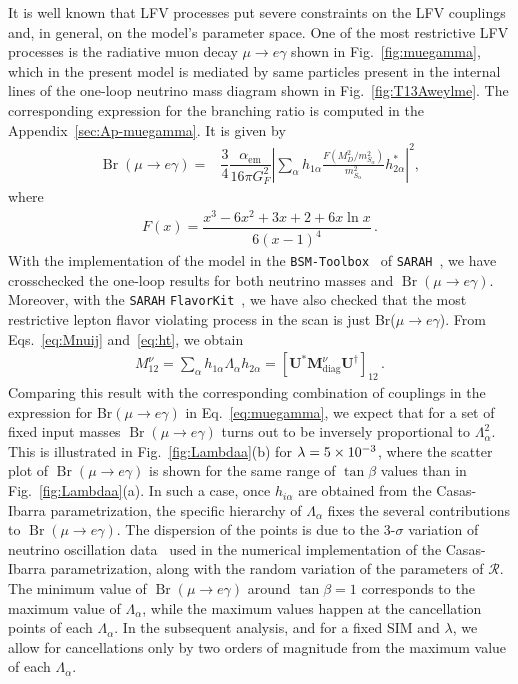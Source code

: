 It is well known that LFV processes put severe constraints on the LFV
couplings and, in general, on the model's parameter space. 
One of the most restrictive LFV processes is the radiative muon decay
$\mu\to e\gamma$ shown in Fig.~\ref{fig:muegamma}, which in the present model is mediated by same
particles present in the internal lines of the one-loop neutrino mass
diagram shown in Fig.~\ref{fig:T13Aweylme}. 
The corresponding expression for the branching ratio is computed in the Appendix~\ref{sec:Ap-muegamma}. It is given by
%
\begin{align}
\label{eq:muegamma}
\operatorname{Br}(\mu \rightarrow e \gamma)=&\dfrac{3}{4}\dfrac{\alpha_{\text{em}}}{16 \pi G_F^2}\left|\sum_{\alpha}
h_{1\alpha}\frac{F\left(M_D^2/m_{S_{\alpha}}^2  \right) }{m_{S_\alpha}^2}h_{2\alpha}^{*}  \right|^2 ,
\end{align}
where
\begin{align}
F(x)=\dfrac{x^3-6x^2+3x+2+6x\ln x}{6(x-1)^4}\,.
\end{align}
%
With the implementation of the model in the
\texttt{BSM-Toolbox}~\cite{Staub:2011dp} of
\texttt{SARAH}~\cite{Staub:2008uz,Staub:2013tta}, we have crosschecked
the one-loop results for both neutrino masses and $\operatorname{Br}(\mu
\rightarrow e \gamma)$.
Moreover, with the \texttt{SARAH}
\texttt{FlavorKit}~\cite{Porod:2014xia}, we have also checked that the
most restrictive lepton flavor violating process in the scan is just Br($\mu\to e\gamma$).
%
From Eqs.~\eqref{eq:Mnuij} and~\eqref{eq:ht}, we obtain
\begin{align}
  M^{\nu}_{12}=\sum_{\alpha} h_{1\alpha} \Lambda_{\alpha}
  h_{2\alpha}=\left[ \mathbf{U}^{*}\mathbf{M}^{\nu}_{\text{diag}}\mathbf{U}^{\dagger} \right]_{12}\,.%
\end{align}
Comparing this result with the corresponding combination of couplings
in the expression for Br$(\mu\to e\gamma)$ in Eq.~\eqref{eq:muegamma},
we expect that for a set of fixed input masses $\operatorname{Br}(\mu
\rightarrow e \gamma)$ turns out to be inversely proportional to
$\Lambda_\alpha^2$.
This is illustrated in Fig.~\ref{fig:Lambdaa}(b)
for $\lambda=\num{5E-3}$, where the scatter plot of
$\operatorname{Br}(\mu\to e \gamma)$ is shown for the same range of $\tan\beta$ values 
 than in Fig.~\ref{fig:Lambdaa}(a).  In such a case, once
$h_{i\alpha}$ are obtained from the Casas-Ibarra parametrization, the
specific hierarchy of $\Lambda_{\alpha}$ fixes the several contributions
to $\operatorname{Br}(\mu \rightarrow e \gamma)$.  The dispersion of
the points is due to the 3-$\sigma$ variation of neutrino oscillation
data~\cite{Forero:2014bxa} used in the numerical implementation of the Casas-Ibarra
 parametrization, along with the random variation of the parameters of
$\boldsymbol{\mathcal{R}}$. The minimum value of
$\operatorname{Br}(\mu \rightarrow e \gamma)$ around $\tan\beta=1$
corresponds to the maximum value of $\Lambda_{\alpha}$, while the
maximum values happen at the cancellation points of each
$\Lambda_{\alpha}$. In the subsequent analysis, and for a fixed SIM and $\lambda$, we allow 
for cancellations only by two orders of magnitude from the maximum
value of each $\Lambda_{\alpha}$. 


